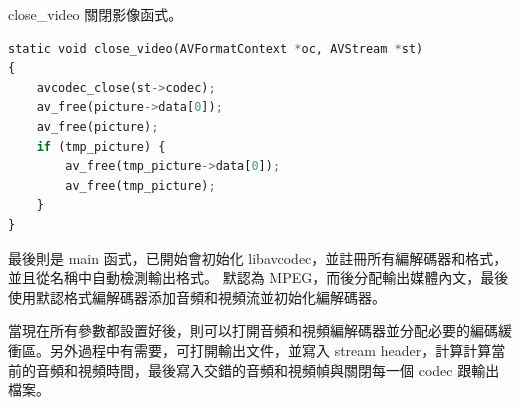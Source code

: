 \documentclass[10pt,UTF8]{ctexart}
\begin{document}
close\_video 關閉影像函式。

\begin{lstlisting}[language={python}]
static void close_video(AVFormatContext *oc, AVStream *st)
{
    avcodec_close(st->codec);
    av_free(picture->data[0]);
    av_free(picture);
    if (tmp_picture) {
        av_free(tmp_picture->data[0]);
        av_free(tmp_picture);
    }
}
\end{lstlisting}

最後則是 main 函式，已開始會初始化 libavcodec，並註冊所有編解碼器和格式，並且從名稱中自動檢測輸出格式。 默認為 MPEG，而後分配輸出媒體內文，最後使用默認格式編解碼器添加音頻和視頻流並初始化編解碼器。

當現在所有參數都設置好後，則可以打開音頻和視頻編解碼器並分配必要的編碼緩衝區。另外過程中有需要，可打開輸出文件，並寫入 stream header，計算計算當前的音頻和視頻時間，最後寫入交錯的音頻和視頻幀與關閉每一個 codec 跟輸出檔案。
\end{document}

